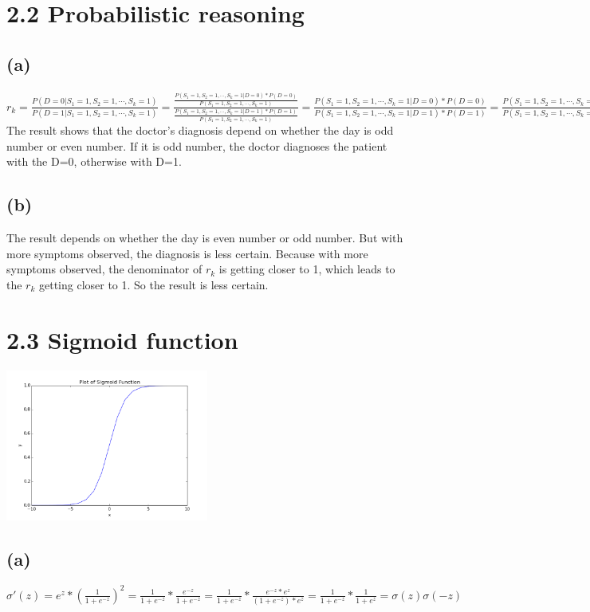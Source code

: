 \documentclass [11pt, a4paper, oneside] {article}
\begin{document}
\section *{2.2 Probabilistic reasoning}
\subsection *{(a)}
$r_k = \frac{P(D=0|S_1=1, S_2=1, \cdots, S_k=1)}{P(D=1|S_1=1, S_2=1, \cdots, S_k=1)} = \frac{\frac{P(S_1=1, S_2=1, \cdots, S_k=1|D=0)*P(D=0)}{P(S_1=1, S_2=1, \cdots, S_k=1)}}{\frac{P(S_1=1, S_2=1, \cdots, S_k=1|D=1)*P(D=1)}{P(S_1=1, S_2=1, \cdots, S_k=1)}} = \frac{P(S_1=1, S_2=1, \cdots, S_k=1|D=0)*P(D=0)}{P(S_1=1, S_2=1, \cdots, S_k=1|D=1)*P(D=1)} =\frac{P(S_1=1, S_2=1, \cdots, S_k=1|D=0)}{P(S_1=1, S_2=1, \cdots, S_k=1|D=1)} =  \frac{P(S_1|D=0)*P(S_2|D=0)*\cdots*P(S_k|D=0)}{P(S_1|D=1)*P(S_2|D=1)*\cdots*P(S_k|D=1)} = \frac{1*\frac{1}{5}*\frac{5}{7}*\cdots*\frac{2^{k-1}+(-1)^{k-1}}{2^k+(-1)^k}}{\frac{1}{2}*\frac{1}{2}*\cdots*\frac{1}{2}} = \frac{\frac{1}{2^k+(-1)^k}}{(\frac{1}{2})^k} = \frac{1}{1+(-\frac{1}{2})^k}$\\
The result shows that the doctor's diagnosis depend on whether the day is odd number or even number. If it is odd number, the doctor diagnoses the patient with the D=0, otherwise with D=1.
\subsection *{(b)}
The result depends on whether the day is even number or odd number. But with more symptoms observed, the diagnosis is less certain. Because with more symptoms observed, the denominator of $r_k$ is getting closer to 1, which leads to the $r_k$ getting closer to 1. So the result is less certain.\\ 
\section *{2.3 Sigmoid function}
\includegraphics[height=5cm]{figure_1.png}
\subsection *{(a)}
$\sigma'(z) = e^z*(\frac{1}{1+e^{-z}})^2 = \frac{1}{1+e^{-z}}*\frac{e^{-z}}{1+e^{-z}} =  \frac{1}{1+e^{-z}}*\frac{e^{-z}*e^{z}}{(1+e^{-z})*e^{z}} = \frac{1}{1+e^{-z}}*\frac{1}{1+e^{z}} = \sigma(z)\sigma(-z)$\\
\end{document}
